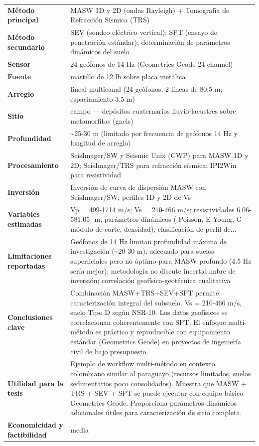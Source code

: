 \begin{center}\scriptsize
\begin{tabularx}{\textwidth}{@{}>{\bfseries}p{3.3cm} X@{}}
\toprule
M\'etodo principal & MASW 1D y 2D (ondas Rayleigh) + Tomografía de Refracción Sísmica (TRS) \\
M\'etodo secundario & SEV (sondeo eléctrico vertical); SPT (ensayo de penetración estándar); determinación de parámetros dinámicos del suelo \\
Sensor & 24 geófonos de 14 Hz (Geometrics Geode 24-channel) \\
Fuente & martillo de 12 lb sobre placa metálica \\
Arreglo & lineal multicanal (24 geófonos; 2 líneas de 80.5 m; espaciamiento 3.5 m) \\
Sitio & campo --- depósitos cuaternarios fluvio-lacustres sobre metamorfitas (gneis) \\
Profundidad & \textasciitilde{}25-30 m (limitado por frecuencia de geófonos 14 Hz y longitud de arreglo) \\
Procesamiento & SeisImager/SW y Seismic Unix (CWP) para MASW 1D y 2D; SeisImager/TRS para refracción sísmica; IPI2Win para resistividad \\
Inversi\'on & Inversión de curva de dispersión MASW con SeisImager/SW; perfiles 1D y 2D de Vs \\
Variables estimadas & Vp = 499-1714 m/s; Vs = 210-466 m/s; resistividades 6.06-581.05 -m; parámetros dinámicos ( Poisson, E Young, G módulo de corte, densidad); clasificación de perfil de... \\
Limitaciones reportadas & Geófonos de 14 Hz limitan profundidad máxima de investigación (\textasciitilde{}20-30 m); adecuado para suelos superficiales pero no óptimo para MASW profundo (4.5 Hz sería mejor); metodología no discute incertidumbre de inversión; correlación geofísica-geotécnica cualitativa \\
Conclusiones clave & Combinación MASW+TRS+SEV+SPT permite caracterización integral del subsuelo. Vs = 210-466 m/s, suelo Tipo D según NSR-10. Los datos geofísicos se correlacionan coherentemente con SPT. El enfoque multi-método es práctico y reproducible con equipamiento estándar (Geometrics Geode) en proyectos de ingeniería civil de bajo presupuesto. \\
Utilidad para la tesis & Ejemplo de workflow multi-método en contexto colombiano similar al paraguayo (recursos limitados, suelos sedimentarios poco consolidados). Muestra que MASW + TRS + SEV + SPT se puede ejecutar con equipo básico Geometrics Geode. Proporciona parámetros dinámicos adicionales útiles para caracterización de sitio completa. \\
Economicidad y factibilidad & media \\
\bottomrule
\end{tabularx}
\end{center}


